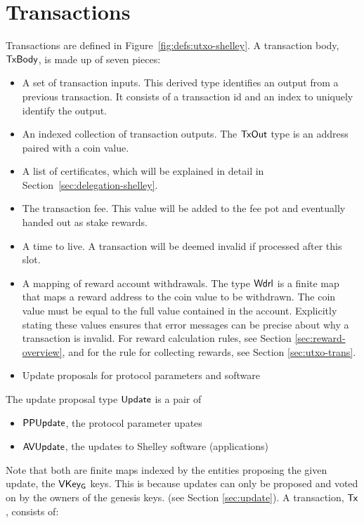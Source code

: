 \section{Transactions}
\label{sec:transactions}

Transactions are defined in Figure~\ref{fig:defs:utxo-shelley}.
A transaction body, $\mathsf{TxBody}$, is made up of seven pieces:

\begin{itemize}
  \item A set of transaction inputs.
    This derived type identifies an output from a previous transaction.
    It consists of a transaction id and an index to uniquely identify the output.
  \item  An indexed collection of transaction outputs.
    The $\mathsf{TxOut}$ type is an address paired with a coin value.
  \item A list of certificates, which will be explained in detail in
    Section~\ref{sec:delegation-shelley}.
  \item The transaction fee. This value will be added to the fee pot and eventually handed out
    as stake rewards.
  \item A time to live. A transaction will be deemed invalid if processed after this slot.
  \item A mapping of reward account withdrawals.  The type $\mathsf{Wdrl}$ is a finite map that maps
    a reward address to the coin value to be withdrawn. The coin value must be equal
    to the full value contained in the account. Explicitly stating these values ensures
    that error messages can be precise about why a transaction is invalid.
    For reward calculation rules, see Section \ref{sec:reward-overview},
    and for the rule for collecting rewards, see Section \ref{sec:utxo-trans}.
  \item Update proposals for protocol parameters and software
\end{itemize}

The update proposal type $\mathsf{Update}$ is a pair of

\begin{itemize}
  \item $\mathsf{PPUpdate}$, the protocol parameter upates
  \item $\mathsf{AVUpdate}$, the updates to Shelley software (applications)
\end{itemize}

Note that both are finite maps indexed by the entities proposing the given
update, the $\mathsf{VKey_G}$ keys. This is because updates
can only be proposed and voted on by the owners of the genesis keys.
(see Section \ref{sec:update}).
A transaction, $\mathsf{Tx}$, consists of:

